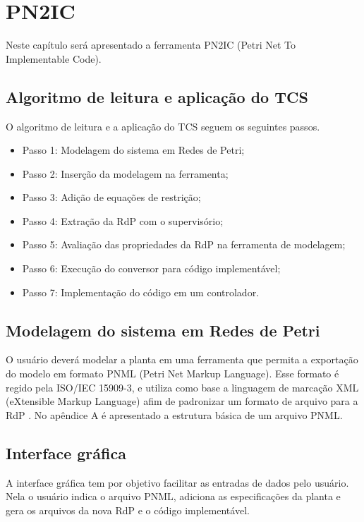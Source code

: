 
\chapter{PN2IC}

Neste cap\'itulo ser\'a apresentado a ferramenta PN2IC (Petri Net To Implementable Code).

\section{Algoritmo de leitura e aplica\c{c}\~ao do TCS}

O algoritmo de leitura e a aplica\c{c}\~ao do TCS seguem os seguintes passos.
 \begin{itemize}
 	\item Passo 1: Modelagem do sistema em Redes de Petri;
 	\item Passo 2: Inser\c{c}\~ao da modelagem na ferramenta;
 	\item Passo 3: Adi\c{c}\~ao de equa\c{c}\~oes de restri\c{c}\~ao;
 	\item Passo 4: Extra\c{c}\~ao da RdP com o supervis\'orio;
 	\item Passo 5: Avalia\c{c}\~ao das propriedades da RdP na ferramenta de modelagem;
 	\item Passo 6: Execu\c{c}\~ao do conversor para c\'odigo implement\'avel;
 	\item Passo 7: Implementa\c{c}\~ao do c\'odigo em um controlador.
 \end{itemize}


\section{Modelagem do sistema em Redes de Petri}
O usu\'ario dever\'a modelar a planta em uma ferramenta que permita a exporta\c{c}\~ao do modelo em formato PNML (Petri Net Markup Language). Esse formato \'e regido pela ISO/IEC 15909-3, e utiliza como base a linguagem de marca\c{c}\~ao XML (eXtensible Markup Language) afim de padronizar um formato de arquivo para a RdP \cite{pnmlorg}. No ap\^endice A \'e apresentado a estrutura b\'asica de um arquivo PNML.

\section{Interface gr\'afica}
A interface gr\'afica tem por objetivo facilitar as entradas de dados pelo usu\'ario. Nela o usu\'ario indica o arquivo PNML, adiciona as especifica\c{c}\~oes da planta e gera os arquivos da nova RdP e o c\'odigo implement\'avel. 

